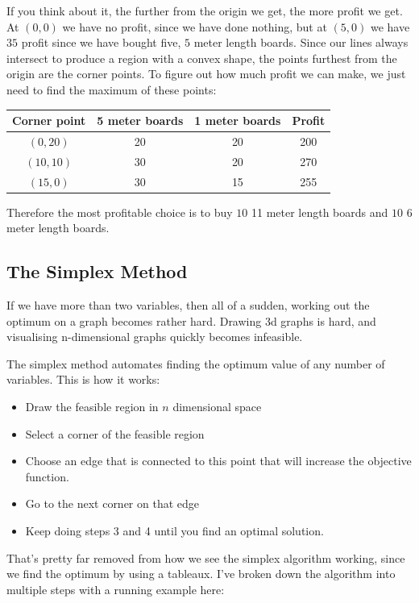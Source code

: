 If you think about it, the further from the origin we get, the more profit we
get. At $(0,0)$ we have no profit, since we have done nothing, but at $(5,0)$ we
have $35$ profit since we have bought five, $5$ meter length boards. Since our
lines always intersect to produce a region with a convex shape, the points
furthest from the origin are the corner points. To figure out how much profit we
can make, we just need to find the maximum of these points:

\begin{center}
  \begin{tabular}{c | c | c | c}
    \textbf{Corner point} & \textbf{5 meter boards} & \textbf{1 meter boards}
      & \textbf{Profit}\\  \hline
    $(0,20)$  & 20 & 20 & 200\\ \hline
    $(10,10)$ & 30 & 20 & 270\\ \hline
    $(15,0)$  & 30 & 15 & 255\\
  \end{tabular}
\end{center}

Therefore the most profitable choice is to buy $10$ 11 meter length boards and
$10$ 6 meter length boards.

\subsection{The Simplex Method}

If we have more than two variables, then all of a sudden, working out the
optimum on a graph becomes rather hard. Drawing 3d graphs is hard, and
visualising n-dimensional graphs quickly becomes infeasible.

The simplex method automates finding the optimum value of any number of
variables. This is how it works:

\begin{itemize}
  \item Draw the feasible region in $n$ dimensional space
  \item Select a corner of the feasible region
  \item Choose an edge that is connected to this point that will increase the
  objective function.
  \item Go to the next corner on that edge
  \item Keep doing steps 3 and 4 until you find an optimal solution.
\end{itemize}

That's pretty far removed from how we see the simplex algorithm working, since
we find the optimum by using a tableaux. I've broken down the algorithm into
multiple steps with a running example here:

